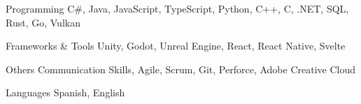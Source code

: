 

\begin{cvskills}

  \cvskill
    {Programming} %
    {C\#, Java, JavaScript, TypeScript, Python, C++, C, .NET, SQL, Rust, Go, Vulkan} %

  \cvskill
    {Frameworks \& Tools} %
    {Unity, Godot, Unreal Engine, React, React Native, Svelte} %

  \cvskill
    {Others} %
    {Communication Skills, Agile, Scrum, Git, Perforce, Adobe Creative Cloud} %

  \cvskill
    {Languages} %
    {Spanish, English} %

\end{cvskills}
